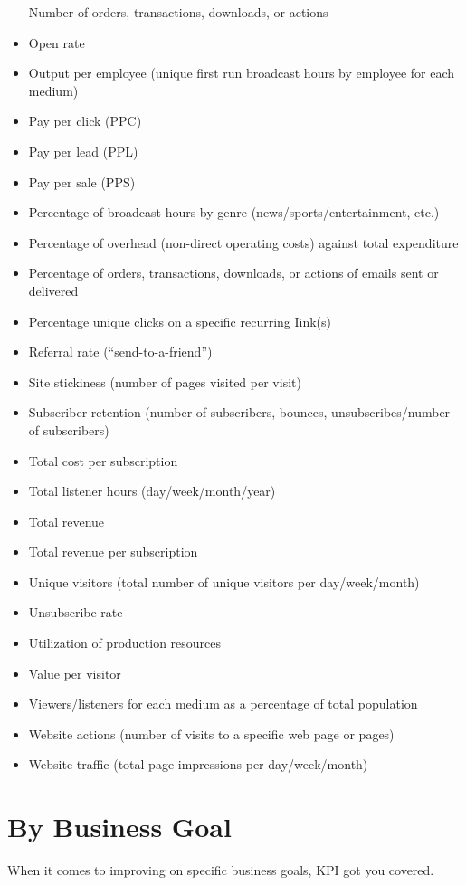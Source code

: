 \documentclass[]{book}
\begin{document}
\begin{itemize}
  Number of orders, transactions, downloads, or actions
\item
  Open rate
\item
  Output per employee (unique first run broadcast hours by employee for
  each medium)
\item
  Pay per click (PPC)
\item
  Pay per lead (PPL)
\item
  Pay per sale (PPS)
\item
  Percentage of broadcast hours by genre (news/sports/entertainment,
  etc.)
\item
  Percentage of overhead (non-direct operating costs) against total
  expenditure
\item
  Percentage of orders, transactions, downloads, or actions of emails
  sent or delivered
\item
  Percentage unique clicks on a specific recurring Iink(s)
\item
  Referral rate (``send-to-a-friend'')
\item
  Site stickiness (number of pages visited per visit)
\item
  Subscriber retention (number of subscribers, bounces,
  unsubscribes/number of subscribers)
\item
  Total cost per subscription
\item
  Total listener hours (day/week/month/year)
\item
  Total revenue
\item
  Total revenue per subscription
\item
  Unique visitors (total number of unique visitors per day/week/month)
\item
  Unsubscribe rate
\item
  Utilization of production resources
\item
  Value per visitor
\item
  Viewers/listeners for each medium as a percentage of total population
\item
  Website actions (number of visits to a specific web page or pages)
\item
  Website traffic (total page impressions per day/week/month)
\end{itemize}

\section{By Business Goal}\label{by-business-goal}

When it comes to improving on specific business goals, KPI got you
covered.
\end{document}
